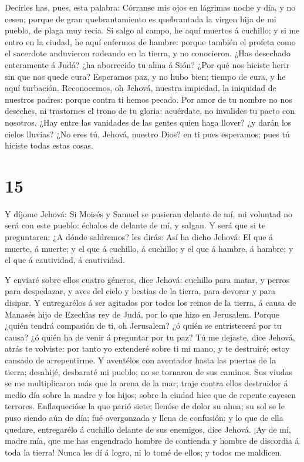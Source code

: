 Decirles has, pues, esta palabra: Córranse mis ojos en
lágrimas noche y día, y no cesen; porque de gran quebrantamiento es
quebrantada la virgen hija de mi pueblo, de plaga muy recia.
 Si salgo al campo, he aquí muertos á cuchillo; y si me
entro en la ciudad, he aquí enfermos de hambre: porque también el
profeta como el sacerdote anduvieron rodeando en la tierra, y no
conocieron.  ¿Has desechado enteramente á Judá? ¿ha
aborrecido tu alma á Sión? ¿Por qué nos hiciste herir sin que nos quede
cura? Esperamos paz, y no hubo bien; tiempo de cura, y he aquí
turbación.  Reconocemos, oh Jehová, nuestra impiedad, la
iniquidad de nuestros padres: porque contra ti hemos pecado.
 Por amor de tu nombre no nos deseches, ni trastornes el
trono de tu gloria: acuérdate, no invalides tu pacto con nosotros.
 ¿Hay entre las vanidades de las gentes quien haga llover?
¿y darán los cielos lluvias? ¿No eres tú, Jehová, nuestro Dios? en ti
pues esperamos; pues tú hiciste todas estas cosas.

\hypertarget{section-14}{%
\section{15}\label{section-14}}

 Y díjome Jehová: Si Moisés y Samuel se pusieran delante de
mí, mi voluntad no será con este pueblo: échalos de delante de mí, y
salgan.  Y será que si te preguntaren: ¿A dónde saldremos?
les dirás: Así ha dicho Jehová: El que á muerte, á muerte; y el que á
cuchillo, á cuchillo; y el que á hambre, á hambre; y el que á
cautividad, á cautividad.

 Y enviaré sobre ellos cuatro géneros, dice Jehová: cuchillo
para matar, y perros para despedazar, y aves del cielo y bestias de la
tierra, para devorar y para disipar.  Y entregarélos á ser
agitados por todos los reinos de la tierra, á causa de Manasés hijo de
Ezechîas rey de Judá, por lo que hizo en Jerusalem.  Porque
¿quién tendrá compasión de ti, oh Jerusalem? ¿ó quién se entristecerá
por tu causa? ¿ó quién ha de venir á preguntar por tu paz? 
Tú me dejaste, dice Jehová, atrás te volviste: por tanto yo extenderé
sobre ti mi mano, y te destruiré; estoy cansado de arrepentirme.
 Y aventélos con aventador hasta las puertas de la tierra;
desahijé, desbaraté mi pueblo; no se tornaron de sus caminos.
 Sus viudas se me multiplicaron más que la arena de la mar;
traje contra ellos destruidor á medio día sobre la madre y los hijos;
sobre la ciudad hice que de repente cayesen terrores. 
Enflaquecióse la que parió siete; llenóse de dolor su alma; su sol se le
puso siendo aún de día; fué avergonzada y llena de confusión: y lo que
de ella quedare, entregarélo á cuchillo delante de sus enemigos, dice
Jehová.  ¡Ay de mí, madre mía, que me has engendrado hombre
de contienda y hombre de discordia á toda la tierra! Nunca les dí á
logro, ni lo tomé de ellos; y todos me maldicen.

